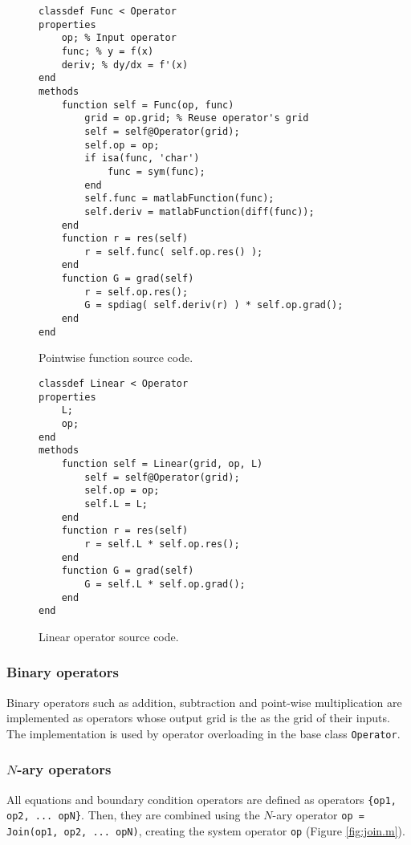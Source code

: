 \documentclass[MSc,beforeExam]{iitcsthesis}
\begin{document}
\begin{figure}[h]
\begin{lstlisting}
classdef Func < Operator
properties
    op; % Input operator
    func; % y = f(x)
    deriv; % dy/dx = f'(x)
end
methods
    function self = Func(op, func)
        grid = op.grid; % Reuse operator's grid
        self = self@Operator(grid);
        self.op = op;
        if isa(func, 'char')
        	func = sym(func); 
        end 
        self.func = matlabFunction(func);
        self.deriv = matlabFunction(diff(func));
    end
    function r = res(self)
        r = self.func( self.op.res() );
    end
    function G = grad(self)
        r = self.op.res();
        G = spdiag( self.deriv(r) ) * self.op.grad();
    end
end
\end{lstlisting}
\caption{Pointwise function source code.} \label{fig:func.m}
\end{figure}
\begin{figure}[h]
\begin{lstlisting}
classdef Linear < Operator
properties
    L;
    op;
end
methods
    function self = Linear(grid, op, L)
        self = self@Operator(grid);
        self.op = op;
        self.L = L;
    end
    function r = res(self)
        r = self.L * self.op.res();
    end
    function G = grad(self)
        G = self.L * self.op.grad();
    end
end
\end{lstlisting}
\caption{Linear operator source code.} \label{fig:linear.m}
\end{figure}

\subsubsection{Binary operators}
Binary operators such as addition, subtraction and point-wise 
multiplication are implemented as operators whose
output grid is the as the grid of their inputs. 
The implementation is used by operator overloading in 
the base class \verb|Operator|.

\subsubsection{$N$-ary operators}
All equations and boundary condition operators are defined
as operators \verb|{op1, op2, ... opN}|. 
Then, they are combined using the $N$-ary operator 
\verb|op = Join(op1, op2, ... opN)|, creating
the system operator \verb|op| (Figure \ref{fig:join.m}).
\end{document}
